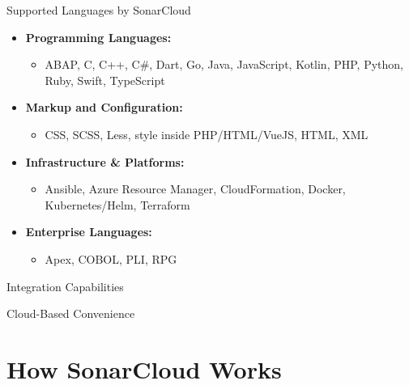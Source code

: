 \documentclass{beamer}
\begin{document}
\begin{frame}{Supported Languages by SonarCloud}
  \begin{itemize}
      \item \textbf{Programming Languages:}
      \begin{itemize}
          \item ABAP, C, C++, C\#, Dart, Go, Java, JavaScript, Kotlin, PHP, Python, Ruby, Swift, TypeScript
      \end{itemize}
      \vspace*{0.5em}
        \item \textbf{Markup and Configuration:}
      \begin{itemize}
        \item CSS, SCSS, Less, style inside PHP/HTML/VueJS, HTML, XML
      \end{itemize}
      \vspace*{0.5em}
      \item \textbf{Infrastructure \& Platforms:}
      \begin{itemize}
        \item Ansible, Azure Resource Manager, CloudFormation, Docker, Kubernetes/Helm, Terraform
      \end{itemize}
      \vspace*{0.5em}
      \item \textbf{Enterprise Languages:}
      \begin{itemize}
        \item Apex, COBOL, PLI, RPG
      \end{itemize}
  \end{itemize}
\end{frame}

\begin{frame}{Integration Capabilities}
  
\end{frame}

\begin{frame}{Cloud-Based Convenience}

\end{frame}


\section[How SonarCloud Works]{How SonarCloud Works}
\end{document}
